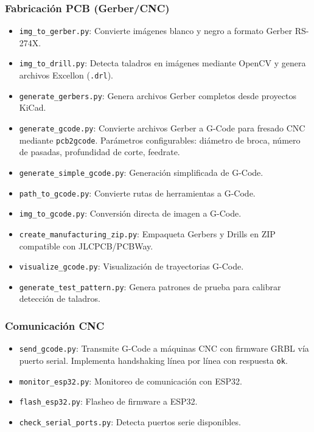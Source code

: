 \documentclass[12pt, a4paper]{article}
\begin{document}
\subsubsection*{Fabricación PCB (Gerber/CNC)}
\begin{itemize}[leftmargin=*]
    \item \texttt{img\_to\_gerber.py}: Convierte imágenes blanco y negro a formato Gerber RS-274X.
    \item \texttt{img\_to\_drill.py}: Detecta taladros en imágenes mediante OpenCV y genera archivos Excellon (\texttt{.drl}).
    \item \texttt{generate\_gerbers.py}: Genera archivos Gerber completos desde proyectos KiCad.
    \item \texttt{generate\_gcode.py}: Convierte archivos Gerber a G-Code para fresado CNC mediante \texttt{pcb2gcode}. Parámetros configurables: diámetro de broca, número de pasadas, profundidad de corte, feedrate.
    \item \texttt{generate\_simple\_gcode.py}: Generación simplificada de G-Code.
    \item \texttt{path\_to\_gcode.py}: Convierte rutas de herramientas a G-Code.
    \item \texttt{img\_to\_gcode.py}: Conversión directa de imagen a G-Code.
    \item \texttt{create\_manufacturing\_zip.py}: Empaqueta Gerbers y Drills en ZIP compatible con JLCPCB/PCBWay.
    \item \texttt{visualize\_gcode.py}: Visualización de trayectorias G-Code.
    \item \texttt{generate\_test\_pattern.py}: Genera patrones de prueba para calibrar detección de taladros.
\end{itemize}

\subsubsection*{Comunicación CNC}
\begin{itemize}[leftmargin=*]
    \item \texttt{send\_gcode.py}: Transmite G-Code a máquinas CNC con firmware GRBL vía puerto serial. Implementa handshaking línea por línea con respuesta \texttt{ok}.
    \item \texttt{monitor\_esp32.py}: Monitoreo de comunicación con ESP32.
    \item \texttt{flash\_esp32.py}: Flasheo de firmware a ESP32.
    \item \texttt{check\_serial\_ports.py}: Detecta puertos serie disponibles.
\end{itemize}
\end{document}

